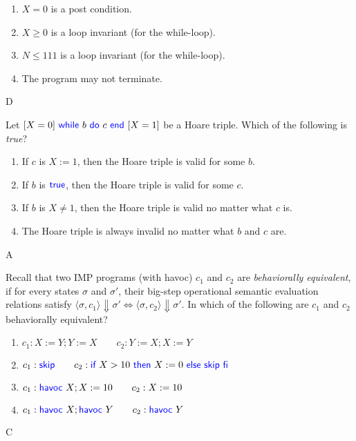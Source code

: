 \documentclass[11pt,a4paper]{article}
\newcommand{\pair}[1]{\langle #1 \rangle}
\newcommand{\evalC}[3]{\pair{#1, #2} \Downarrow #3}
\newcommand{\kword}[1]{{\color{blue} \textsf{#1}}}
\newcommand{\True}{\kword{true}}
\newcommand{\Skip}{\kword{skip}}
\newcommand{\If}{\kword{if}}
\newcommand{\Then}{\kword{then}}
\newcommand{\Else}{\kword{else}}
\newcommand{\Fi}{\kword{fi}}
\newcommand{\While}{\kword{while}}
\newcommand{\Do}{\kword{do}}
\newcommand{\End}{\kword{end}}
\newcommand{\Havoc}{\kword{havoc}}
\begin{document}
\begin{enumerate}[label=(\Alph*)]
    \item $X=0$ is a post condition.
    \item $X \ge 0$ is a loop invariant (for the while-loop).
    \item $N \le 111$ is a loop invariant (for the while-loop).
    \item The program may not terminate.
\end{enumerate}

\begin{solution}
   D
\end{solution}

\subproblem Let $[X=0]~\While~b~\Do~c~\End~[X=1]$ be a Hoare triple.
Which of the following is \emph{true}?

\begin{enumerate}[label=(\Alph*)]
    \item If $c$ is $X:=1$, then the Hoare triple is valid for some $b$.
    \item If $b$ is $\True$, then the Hoare triple is valid for some $c$.
    \item If $b$ is $X\not=1$, then the Hoare triple is valid no matter what $c$ is.
    \item The Hoare triple is always invalid no matter what $b$ and $c$ are.
\end{enumerate}

\begin{solution}
    A
\end{solution}

\subproblem Recall that two IMP programs (with havoc) $c_1$ and $c_2$ are \emph{behaviorally equivalent},
if for every states $\sigma$ and $\sigma'$, their big-step operational semantic evaluation relations satisfy $\evalC{\sigma}{c_1}{\sigma'} \iff \evalC{\sigma}{c_2}{\sigma'}$.
In which of the following are $c_1$ and $c_2$ behaviorally equivalent?

\begin{enumerate}[label=(\Alph*)]
    \item $c_1: X:=Y; Y:=X \qquad c_2: Y:=X; X:=Y$
    \item $c_1: \Skip \qquad c_2: \If~X>10~\Then~X:=0~\Else~\Skip~\Fi$
    \item $c_1: \Havoc~X; X:=10 \qquad c_2: X:=10$
    \item $c_1: \Havoc~X; \Havoc~Y \qquad c_2: \Havoc~Y$
\end{enumerate}

\begin{solution}
    C
\end{solution}
\end{document}
